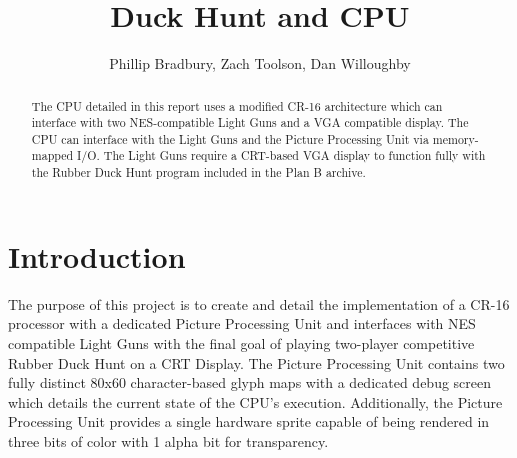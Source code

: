 \documentclass[letterpaper, 11 pt, conference]{article}
\title{\Huge \textbf{Duck Hunt and CPU }}
\author{Phillip Bradbury, Zach Toolson, Dan Willoughby}
\begin{document}
\maketitle
\clearpage

\tableofcontents
\clearpage
\begin{abstract}
  The CPU detailed in this report uses a modified CR-16 architecture which can interface with two NES-compatible Light Guns and a VGA compatible display.  The CPU can interface with the Light Guns and the Picture Processing Unit via memory-mapped I/O.  The Light Guns require a CRT-based VGA display to function fully with the Rubber Duck Hunt program included in the Plan B archive.

\end{abstract}

\section{Introduction}
The purpose of this project is to create and detail the implementation of a CR-16 processor with a dedicated Picture Processing Unit and interfaces with NES compatible Light Guns with the final goal of playing two-player competitive Rubber Duck Hunt on a CRT Display.  The Picture Processing Unit contains two fully distinct 80x60 character-based glyph maps with a dedicated debug screen which details the current state of the CPU's execution.  Additionally, the Picture Processing Unit provides a single hardware sprite capable of being rendered in three bits of color with 1 alpha bit for transparency.
\end{document}
